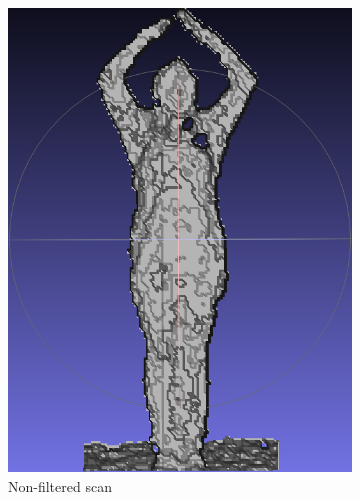 \documentclass[pdftex,10.5pt]{report}
\begin{document}
\begin{figure}[H]
	\centering
	\begin{subfigure}[H]{0.4\textwidth}
		\includegraphics[width=\textwidth]{figures/unfiltered}
		\caption{Non-filtered scan}
	\end{subfigure}
	\begin{subfigure}[H]{0.4\textwidth}

\end{subfigure}
\end{figure}
\end{document}
